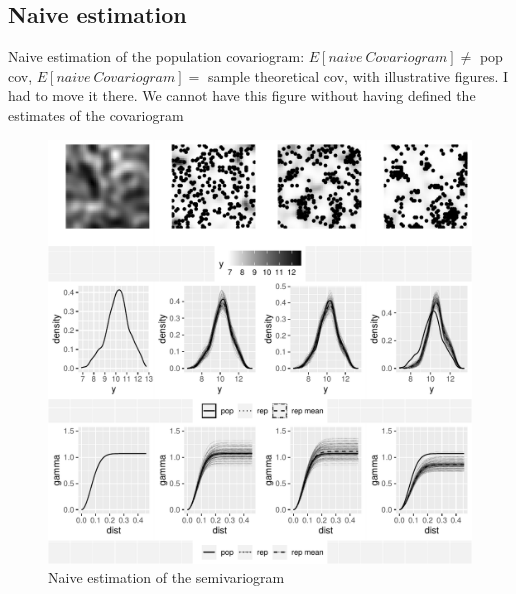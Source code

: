 \subsection{Naive estimation}
 Naive estimation of the population covariogram:
 $E[naive~Covariogram]\neq$ pop cov,
 $E[naive~Covariogram]=$ sample theoretical cov, 
 with illustrative figures.
{\color{red} I had to move it there. We cannot have this figure without having defined the estimates of the covariogram}
\begin{figure}[H]
\caption{Naive estimation of the semivariogram}
\label{fig:4}
\includegraphics{fig/figure4.pdf}
\end{figure}
